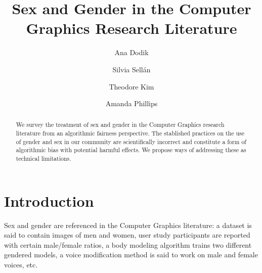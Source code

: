 \documentclass[sigconf,balance=false]{acmart}
\begin{document}
\title{Sex and Gender in the Computer Graphics Research Literature}

\author{Ana Dodik}

\author{Silvia Sellán}\authornotemark[1]

\author{Theodore Kim}

\author{Amanda Phillips}



\begin{abstract}
    We survey the treatment of sex and gender in the Computer Graphics research
    literature from an algorithmic fairness perspective. The
    stablished practices on the use of gender and sex in our community are scientifically incorrect and constitute a
    form of algorithmic bias with potential harmful effects. We propose ways of addressing these as technical limitations.
\end{abstract}


\maketitle

\section{Introduction}


Sex and gender are referenced in the Computer Graphics literature: a dataset is said to contain images of men and women, user study participants are reported with certain male/female ratios, a body modeling algorithm trains two different gendered models, a voice modification method is said to work on male and female voices, etc.
\end{document}
